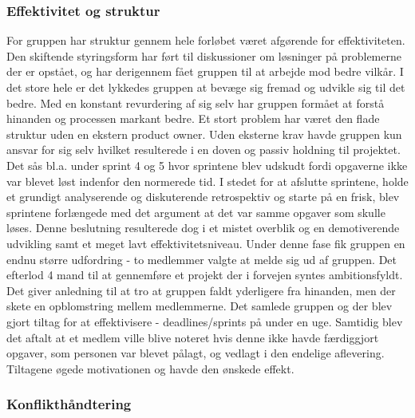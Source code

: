\subsubsection{Effektivitet og struktur}
For gruppen har struktur gennem hele forløbet været afgørende for effektiviteten. Den skiftende styringsform har ført til diskussioner
 om løsninger på problemerne der er opstået, og har derigennem fået gruppen til at arbejde mod bedre vilkår. I det store hele er det lykkedes gruppen at bevæge
 sig fremad og udvikle sig til det bedre. Med en konstant revurdering af sig selv har gruppen formået at forstå hinanden og processen markant bedre.
Et stort problem har været den flade struktur uden en ekstern product owner. Uden eksterne krav havde gruppen kun ansvar for sig selv hvilket resulterede i en 
doven og passiv holdning til projektet. Det sås bl.a. under sprint 4 og 5 hvor sprintene blev udskudt fordi opgaverne ikke var blevet løst indenfor den 
normerede tid. I stedet for at afslutte  sprintene, holde et grundigt analyserende og diskuterende retrospektiv og starte på en frisk, blev sprintene 
forlængede med det argument at det var samme opgaver som skulle løses. Denne beslutning resulterede dog i et mistet overblik og en demotiverende udvikling 
samt et meget lavt effektivitetsniveau. Under denne fase fik gruppen en endnu større udfordring - to medlemmer valgte at melde sig ud af gruppen.
 Det efterlod 4 mand til at gennemføre et projekt der i forvejen syntes ambitionsfyldt. Det giver anledning til at tro at gruppen faldt yderligere fra hinanden,
 men der skete en opblomstring mellem medlemmerne. Det samlede gruppen og der blev gjort tiltag for at effektivisere - deadlines/sprints på under en uge. 
 Samtidig blev det aftalt at et medlem ville blive noteret hvis denne ikke havde færdiggjort opgaver, som personen var blevet
 pålagt, og vedlagt i den endelige aflevering. Tiltagene øgede motivationen og havde den ønskede effekt.

\subsubsection{Konflikthåndtering}

